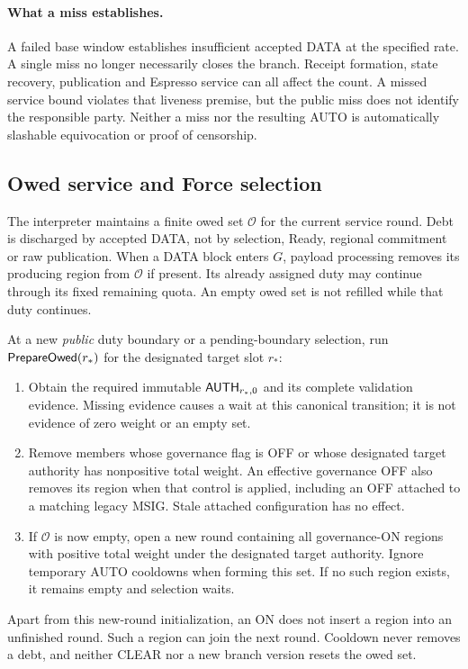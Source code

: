 \paragraph{What a miss establishes.}
A failed base window establishes insufficient accepted DATA at the
specified rate. A single miss no longer necessarily closes the branch.
Receipt formation, state recovery, publication and Espresso service can
all affect the count. A missed service bound violates that liveness
premise, but the public miss does not identify the responsible party.
Neither a miss nor the resulting AUTO is automatically slashable
equivocation or proof of censorship.

\subsection{Owed service and Force selection}
\label{sec:owed}
The interpreter maintains a finite owed set $\mathcal O$ for the
current service round. Debt is discharged by accepted DATA, not by
selection, Ready, regional commitment or raw publication. When a DATA
block enters $G$, payload processing removes its producing region
from $\mathcal O$ if present. Its already assigned duty may continue
through its fixed remaining quota. An empty owed set is not refilled
while that duty continues.

At a new \emph{public} duty boundary or a pending-boundary selection,
run $\mathsf{PrepareOwed}(r_*)$ for the designated target slot $r_*$:
\begin{enumerate}[label=(\roman*),itemsep=2pt]
\item Obtain the required immutable $\mathsf{AUTH}_{r_*,0}$ and its
complete validation evidence. Missing evidence causes a wait at this
canonical transition; it is not evidence of zero weight or an empty set.
\item Remove members whose governance flag is OFF or whose designated
target authority has nonpositive total weight. An effective governance
OFF also removes its region when that control is applied, including an
OFF attached to a matching legacy MSIG. Stale attached configuration
has no effect.
\item If $\mathcal O$ is now empty, open a new round containing all
governance-ON regions with positive total weight under the designated
target authority. Ignore temporary AUTO cooldowns when forming this
set. If no such region exists, it remains empty and selection waits.
\end{enumerate}
Apart from this new-round initialization, an ON does not insert a
region into an unfinished round. Such a region can join the next
round. Cooldown never removes a debt, and neither CLEAR nor a new
branch version resets the owed set.

